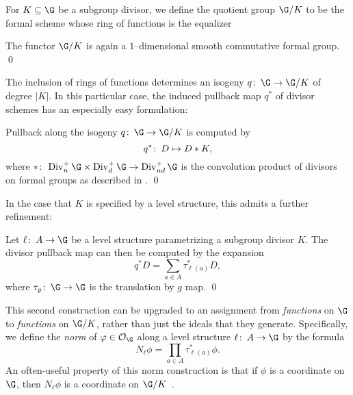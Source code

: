\begin{definition}
For \(K \subseteq \G\) be a subgroup divisor, we define the quotient group \(\G/K\) to be the formal scheme whose ring of functions is the equalizer
\begin{center}
\end{center}
\end{definition}

\begin{lemma}
The functor \(\G/K\) is again a \(1\)--dimensional smooth commutative formal group. \qed
\end{lemma}

The inclusion of rings of functions determines an isogeny \(q\co \G \to \G/K\) of degree \(|K|\).  In this particular case, the induced pullback map \(q^*\) of divisor schemes has an especially easy formulation:
\begin{lemma}
Pullback along the isogeny \(q\co \G \to \G/K\) is computed by \[q^* \colon\thinspace D \mapsto D * K,\] where \(*\co \Div_n^+ \G \times \Div_d^+ \G \to \Div_{nd}^+ \G\) is the convolution product of divisors on formal groups as described in . \qed
\end{lemma}

In the case that \(K\) is specified by a level structure, this admits a further refinement:
\begin{corollary}
Let \(\ell\co A \to \G\) be a level structure parametrizing a subgroup divisor \(K\).  The divisor pullback map can then be computed by the expansion \[q^* D = \sum_{a \in A} \tau_{\ell(a)}^* D,\] where \(\tau_g\co \G \to \G\) is the translation by \(g\) map. \qed
\end{corollary}

\begin{definition}\label{NormForFns}
This second construction can be upgraded to an assignment from \emph{functions} on \(\G\) to \emph{functions} on \(\G/K\), rather than just the ideals that they generate.  Specifically, we define the \textit{norm} of \(\phi \in \sheaf O_{\G}\) along a level structure \(\ell\co A \to \G\) by the formula \[N_\ell \phi = \prod_{a \in A} \tau_{\ell(a)}^* \phi.\]  An often-useful property of this norm construction is that if \(\phi\) is a coordinate on \(\G\), then \(N_\ell \phi\) is a coordinate on \(\G/K\)~\cite[Theorem 5.3.1]{StricklandFiniteSubgps}.
\end{definition}

